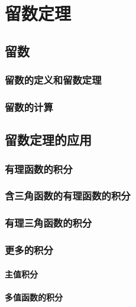 \chapter{留数定理}
\section{留数}
    \subsection{留数的定义和留数定理}
    \subsection{留数的计算}

\section{留数定理的应用}
    \subsection{有理函数的积分}
    \subsection{含三角函数的有理函数的积分}
    \subsection{有理三角函数的积分}
    \subsection{更多的积分}
        \subsubsection{主值积分}
        \subsubsection{多值函数的积分}


